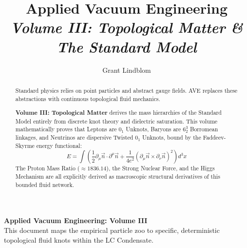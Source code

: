 \title{\textbf{Applied Vacuum Engineering} \\ \large \textit{Volume III: Topological Matter \& The Standard Model}}
\author{Grant Lindblom}
\date{}

\maketitle

\vfill
\noindent\textbf{Applied Vacuum Engineering: Volume III} \\
This document maps the empirical particle zoo to specific, deterministic topological fluid knots within the LC Condensate.

\begin{abstract}
    Standard physics relies on point particles and abstract gauge fields. AVE replaces these abstractions with continuous topological fluid mechanics.
    
    \textbf{Volume III: Topological Matter} derives the mass hierarchies of the Standard Model entirely from discrete knot theory and dielectric saturation. This volume mathematically proves that Leptons are $0_1$ Unknots, Baryons are $6^3_2$ Borromean linkages, and Neutrinos are dispersive Twisted $0_1$ Unknots, bound by the Faddeev-Skyrme energy functional:
    \begin{equation}
        E = \int \left( \frac{1}{2}\partial_\mu \vec{n} \cdot \partial^\mu \vec{n} + \frac{1}{4e^2}(\partial_\mu \vec{n} \times \partial_\nu \vec{n})^2 \right) d^3x
    \end{equation}
    The Proton Mass Ratio ($\approx 1836.14$), the Strong Nuclear Force, and the Higgs Mechanism are all explicitly derived as macroscopic structural derivatives of this bounded fluid network.
\end{abstract}
